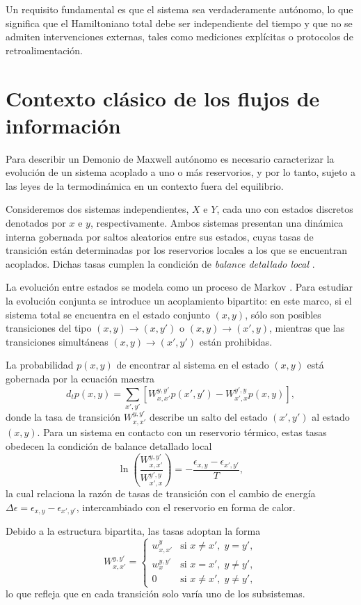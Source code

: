 Un requisito fundamental es que el sistema sea verdaderamente autónomo, lo que significa que el Hamiltoniano total debe ser independiente del tiempo y que no se admiten intervenciones externas, tales como mediciones explícitas o protocolos de retroalimentación.

\label{sec4:autonomo}
\section{Contexto clásico de los flujos de información}

Para describir un Demonio de Maxwell autónomo es necesario caracterizar la evolución de un sistema acoplado a uno o más reservorios, y por lo tanto, sujeto a las leyes de la termodinámica en un contexto fuera del equilibrio. 

Consideremos dos sistemas independientes, \( X \) e \( Y \), cada uno con estados discretos denotados por \( x \) e \( y \), respectivamente. Ambos sistemas presentan una dinámica interna gobernada por saltos aleatorios entre sus estados, cuyas tasas de transición están determinadas por los reservorios locales a los que se encuentran acoplados. Dichas tasas cumplen la condición de \textit{balance detallado local} \cite{van2015ensemble}. 

La evolución entre estados se modela como un proceso de Markov \cite{van1992stochastic}. Para estudiar la evolución conjunta se introduce un acoplamiento bipartito: en este marco, si el sistema total se encuentra en el estado conjunto \((x,y)\), sólo son posibles transiciones del tipo \((x,y)\to(x,y')\) o \((x,y)\to(x',y)\), mientras que las transiciones simultáneas \((x,y)\to(x',y')\) están prohibidas.

La probabilidad \( p(x,y) \) de encontrar al sistema en el estado \((x,y)\) está gobernada por la ecuación maestra
\[
d_{t}p(x,y) = \sum_{x',y'} \left[ W_{x,x'}^{y,y'}p(x',y') - W_{x',x}^{y',y}p(x,y) \right],
\]
donde la tasa de transición \( W_{x,x'}^{y,y'} \) describe un salto del estado \((x',y')\) al estado \((x,y)\). Para un sistema en contacto con un reservorio térmico, estas tasas obedecen la condición de balance detallado local
\[
\ln \left( \frac{W_{x,x'}^{y,y'}}{W_{x',x}^{y',y}} \right) = -\frac{\epsilon_{x,y}-\epsilon_{x',y'}}{T},
\]
la cual relaciona la razón de tasas de transición con el cambio de energía \(\Delta \epsilon = \epsilon_{x,y}-\epsilon_{x',y'}\), intercambiado con el reservorio en forma de calor. 

Debido a la estructura bipartita, las tasas adoptan la forma
\[
W_{x,x'}^{y,y'} = 
\begin{cases}
w_{x,x'}^{y} & \text{si } x\neq x', \; y=y', \\[2mm]
w_{x}^{y,y'} & \text{si } x=x', \; y\neq y', \\[2mm]
0 & \text{si } x\neq x', \; y\neq y',
\end{cases}
\]
lo que refleja que en cada transición solo varía uno de los subsistemas.

